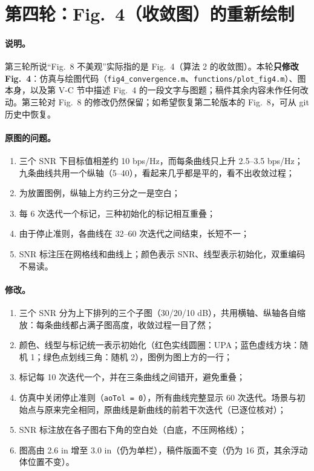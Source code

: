 \documentclass[11pt,a4paper]{ctexart}
\newcommand{\code}[1]{\texttt{#1}}
\begin{document}
\section{第四轮：Fig.~4（收敛图）的重新绘制}
\paragraph{说明。}第三轮所说“Fig.~8 不美观”实际指的是 Fig.~4（算法 2 的收敛图）。本轮\textbf{只修改 Fig.~4}：仿真与绘图代码（\code{fig4\_convergence.m}、\code{functions/plot\_fig4.m}）、图本身，以及第 V-C 节中描述 Fig.~4 的一段文字与图题；稿件其余内容未作任何改动。第三轮对 Fig.~8 的修改仍然保留；如希望恢复第二轮版本的 Fig.~8，可从 git 历史中恢复。

\paragraph{原图的问题。}
\begin{enumerate}
\item 三个 SNR 下目标值相差约 10 bps/Hz，而每条曲线只上升 2.5--3.5 bps/Hz；九条曲线共用一个纵轴（5--40），看起来几乎都是平的，看不出收敛过程；
\item 为放置图例，纵轴上方约三分之一是空白；
\item 每 6 次迭代一个标记，三种初始化的标记相互重叠；
\item 由于停止准则，各曲线在 32--60 次迭代之间结束，长短不一；
\item SNR 标注压在网格线和曲线上；颜色表示 SNR、线型表示初始化，双重编码不易读。
\end{enumerate}

\paragraph{修改。}
\begin{enumerate}
\item 三个 SNR 分为上下排列的三个子图（30/20/10 dB），共用横轴、纵轴各自缩放：每条曲线都占满子图高度，收敛过程一目了然；
\item 颜色、线型与标记统一表示初始化（红色实线圆圈：UPA；蓝色虚线方块：随机 1；绿色点划线三角：随机 2），图例为图上方的一行；
\item 标记每 10 次迭代一个，并在三条曲线之间错开，避免重叠；
\item 仿真中关闭停止准则（\code{aoTol = 0}），所有曲线完整显示 60 次迭代。场景与初始点与原来完全相同，原曲线是新曲线的前若干次迭代（已逐位核对）；
\item SNR 标注放在各子图右下角的空白处（白底，不压网格线）；
\item 图高由 2.6 in 增至 3.0 in（仍为单栏），稿件版面不变（仍为 16 页，其余浮动体位置不变）。
\end{enumerate}
\end{document}
